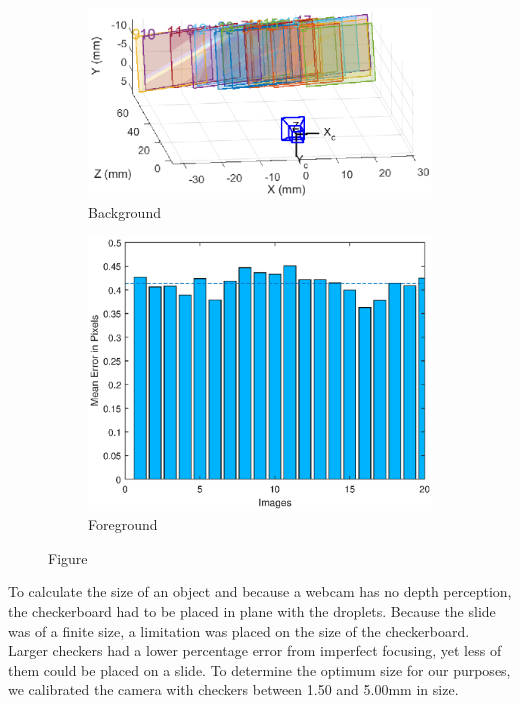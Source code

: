 \documentclass{physics_article_B}
\begin{document}
    \begin{figure}[H]
        \centering
        \begin{subfigure}[b]{0.4\textwidth}
            \includegraphics[width=\textwidth]{Figures/CameraExtrinsics.eps}
            \caption{Background}
            \label{fig:calib:pos}
        \end{subfigure}
        \begin{subfigure}[b]{0.4\textwidth}
            \includegraphics[width=\textwidth]{Figures/CameraError.eps}
            \caption{Foreground}
            \label{fig:calib:error}
        \end{subfigure}
        \caption{Figure }\label{fig:calib}
    \end{figure}
    
    To calculate the size of an object and because a webcam has no depth perception, the checkerboard had to be placed in plane with the droplets. Because the slide was of a finite size, a limitation was placed on the size of the checkerboard. Larger checkers had a lower percentage error from imperfect focusing, yet less of them could be placed on a slide. To determine the optimum size for our purposes, we calibrated the camera with checkers between 1.50 and 5.00mm in size. \\
    
\end{document}
